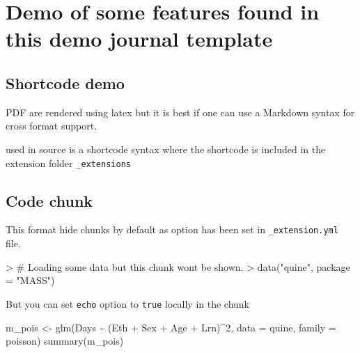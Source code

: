\documentclass[
  11pts,
]{article}
\newenvironment{Shaded}{\begin{snugshade}}{\end{snugshade}}
\newcommand{\AttributeTok}[1]{\textcolor[rgb]{0.40,0.45,0.13}{#1}}
\newcommand{\CommentTok}[1]{\textcolor[rgb]{0.37,0.37,0.37}{#1}}
\newcommand{\DecValTok}[1]{\textcolor[rgb]{0.68,0.00,0.00}{#1}}
\newcommand{\ErrorTok}[1]{\textcolor[rgb]{0.68,0.00,0.00}{#1}}
\newcommand{\FunctionTok}[1]{\textcolor[rgb]{0.28,0.35,0.67}{#1}}
\newcommand{\NormalTok}[1]{\textcolor[rgb]{0.00,0.23,0.31}{#1}}
\newcommand{\OtherTok}[1]{\textcolor[rgb]{0.00,0.23,0.31}{#1}}
\newcommand{\SpecialCharTok}[1]{\textcolor[rgb]{0.37,0.37,0.37}{#1}}
\newcommand{\StringTok}[1]{\textcolor[rgb]{0.13,0.47,0.30}{#1}}
\begin{document}
\section{Demo of some features found in this demo journal
template}\label{demo-of-some-features-found-in-this-demo-journal-template}

\subsection{Shortcode demo}\label{sec-shortcode}

PDF are rendered using latex but it is best if one can use a Markdown
syntax for cross format support.

\texttt{} used in source is a shortcode syntax where the shortcode is
included in the extension folder \texttt{\_extensions}

\subsection{Code chunk}\label{sec-chunks}

This format hide chunks by default as option has been set in
\texttt{\_extension.yml} file.

\begin{Shaded}
\begin{Highlighting}[]
\SpecialCharTok{\textgreater{}} \CommentTok{\# Loading some data but this chunk won\textquotesingle{}t be shown.}
\ErrorTok{\textgreater{}} \FunctionTok{data}\NormalTok{(}\StringTok{"quine"}\NormalTok{, }\AttributeTok{package =} \StringTok{"MASS"}\NormalTok{)}
\end{Highlighting}
\end{Shaded}

But you can set \texttt{echo} option to \texttt{true} locally in the
chunk

\begin{Shaded}
\begin{Highlighting}[]
\NormalTok{m\_pois }\OtherTok{\textless{}{-}} \FunctionTok{glm}\NormalTok{(Days }\SpecialCharTok{\textasciitilde{}}\NormalTok{ (Eth }\SpecialCharTok{+}\NormalTok{ Sex }\SpecialCharTok{+}\NormalTok{ Age }\SpecialCharTok{+}\NormalTok{ Lrn)}\SpecialCharTok{\^{}}\DecValTok{2}\NormalTok{, }\AttributeTok{data =}\NormalTok{ quine, }\AttributeTok{family =}\NormalTok{ poisson)}
\FunctionTok{summary}\NormalTok{(m\_pois)}
\end{Highlighting}
\end{Shaded}
\end{document}

